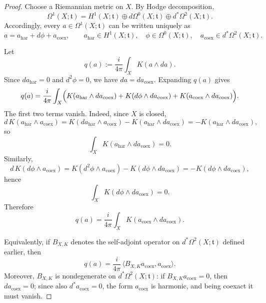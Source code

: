 \documentclass[12pt]{amsart}
\numberwithin{equation}{section}
\begin{document}
\begin{proof}
Choose a Riemannian metric on \(X\). By Hodge decomposition,
\[
\Omega^1(X;\mathfrak t)
=
H^1(X;\mathfrak t)
\oplus
d\Omega^0(X;\mathfrak t)
\oplus
d^*\Omega^2(X;\mathfrak t).
\]
Accordingly, every \(a\in \Omega^1(X;\mathfrak t)\) can be written uniquely as
\[
a=a_{\mathrm{har}}+d\phi+a_{\mathrm{coex}},
\qquad
a_{\mathrm{har}}\in H^1(X;\mathfrak t),\quad
\phi\in \Omega^0(X;\mathfrak t),\quad
a_{\mathrm{coex}}\in d^*\Omega^2(X;\mathfrak t).
\]

Let
\[
q(a):=\frac{i}{4\pi}\int_X K(a\wedge da).
\]
Since \(da_{\mathrm{har}}=0\) and \(d^2\phi=0\), we have $da=da_{\mathrm{coex}}.$ Expanding \(q(a)\) gives
\[
q(a)
=
\frac{i}{4\pi}\int_X
\Bigl(
K(a_{\mathrm{har}}\wedge da_{\mathrm{coex}})
+
K(d\phi\wedge da_{\mathrm{coex}})
+
K(a_{\mathrm{coex}}\wedge da_{\mathrm{coex}})
\Bigr).
\]
The first two terms vanish. Indeed, since \(X\) is closed,
\[
d\,K(a_{\mathrm{har}}\wedge a_{\mathrm{coex}})
=
K(da_{\mathrm{har}}\wedge a_{\mathrm{coex}})
-
K(a_{\mathrm{har}}\wedge da_{\mathrm{coex}})
=
-
K(a_{\mathrm{har}}\wedge da_{\mathrm{coex}}),
\]
so
\[
\int_X K(a_{\mathrm{har}}\wedge da_{\mathrm{coex}})=0.
\]
Similarly,
\[
d\,K(d\phi\wedge a_{\mathrm{coex}})
=
K(d^2\phi\wedge a_{\mathrm{coex}})
-
K(d\phi\wedge da_{\mathrm{coex}})
=
-
K(d\phi\wedge da_{\mathrm{coex}}),
\]
hence
\[
\int_X K(d\phi\wedge da_{\mathrm{coex}})=0.
\]
Therefore
\[
q(a)=\frac{i}{4\pi}\int_X K(a_{\mathrm{coex}}\wedge da_{\mathrm{coex}}).
\]

Equivalently, if \(B_{X,K}\) denotes the self-adjoint operator on
\(d^*\Omega^2(X;\mathfrak t)\) defined earlier, then
\[
q(a)=\frac{i}{4\pi}\,\langle B_{X,K}a_{\mathrm{coex}},a_{\mathrm{coex}}\rangle.
\]
Moreover, \(B_{X,K}\) is nondegenerate on \(d^*\Omega^2(X;\mathfrak t)\): if
\(B_{X,K}a_{\mathrm{coex}}=0\), then \(da_{\mathrm{coex}}=0\); since also
\(d^*a_{\mathrm{coex}}=0\), the form \(a_{\mathrm{coex}}\) is harmonic, and being
coexact it must vanish.


\end{proof}
\end{document}
